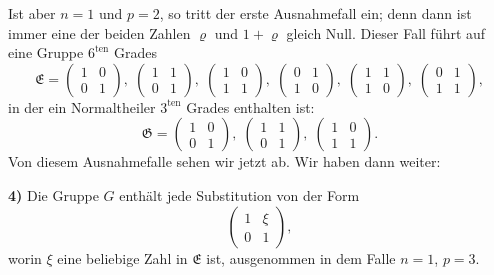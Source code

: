 \documentclass[12pt,a4paper]{article}
\begin{document}
Ist aber $n = 1$ und $p = 2$, so tritt der erste Ausnahmefall ein; denn dann ist immer eine der beiden Zahlen $\varrho$ und $1 + \varrho$ gleich Null. Dieser Fall führt auf eine Gruppe $6^{\text{ten}}$ Grades
\[
\mathfrak{E} =
\begin{pmatrix}1&0\\0&1\end{pmatrix},\;
\begin{pmatrix}1&1\\0&1\end{pmatrix},\;
\begin{pmatrix}1&0\\1&1\end{pmatrix},\;
\begin{pmatrix}0&1\\1&0\end{pmatrix},\;
\begin{pmatrix}1&1\\1&0\end{pmatrix},\;
\begin{pmatrix}0&1\\1&1\end{pmatrix},
\]
in der ein Normaltheiler $3^{\text{ten}}$ Grades enthalten ist:
\[
\mathfrak{G} =
\begin{pmatrix}1&0\\0&1\end{pmatrix},\;
\begin{pmatrix}1&1\\0&1\end{pmatrix},\;
\begin{pmatrix}1&0\\1&1\end{pmatrix}.
\]
Von diesem Ausnahmefalle sehen wir jetzt ab. Wir haben dann weiter:

\medskip\noindent
\textbf{4)} Die Gruppe $G$ enthält jede Substitution von der Form
\[
\begin{pmatrix}1&\xi\\0&1\end{pmatrix},
\]
worin $\xi$ eine beliebige Zahl in $\mathfrak{E}$ ist, ausgenommen in dem Falle $n = 1$, $p = 3$.
\end{document}
